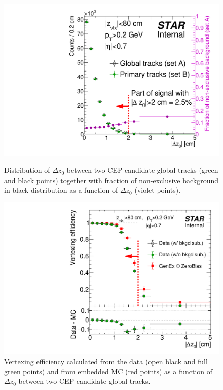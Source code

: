 \begin{figure}[ht!]%
\centering%
\begin{minipage}{.4725\textwidth}%
  \centering%
  \includegraphics[width=\linewidth]{graphics/corrections/DeltaZ0WithBackground.pdf}%
  \caption[Distribution of $\Delta z_{0}$ together with fraction of non-exclusive background.]{Distribution of $\Delta z_{0}$ between two CEP-candidate global tracks (green and black points) together with fraction of non-exclusive background in black distribution as a function of $\Delta z_{0}$ (violet points).}\label{fig:deltaZ0}
\end{minipage}%
\quad\quad%
\begin{minipage}{.4725\textwidth}%
  \centering
  \includegraphics[width=\linewidth]{graphics/corrections/VertexingEfficiency.pdf}%
  \caption[Vertexing efficiency.]{Vertexing efficiency calculated from the data (open black and full green points) and from embedded MC (red points) as a function of $\Delta z_{0}$ between two CEP-candidate global tracks.}\label{fig:vertexingEff}
\end{minipage}%
\end{figure}%

